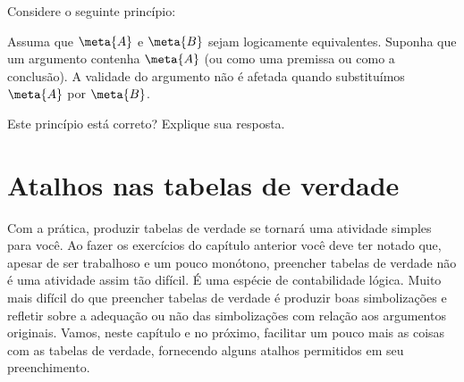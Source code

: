 \problempart 
Considere o seguinte princípio:
	\begin{ebullet}
		\item Assuma que $\meta{A}$ e $\meta{B}$ sejam logicamente equivalentes.
		Suponha que um argumento contenha $\meta{A}$ (ou como uma premissa ou como a conclusão).
		A validade do argumento não é afetada quando substituímos $\meta{A}$ por $\meta{B}$.
	\end{ebullet}
Este princípio está correto? Explique sua resposta.


\chapter{Atalhos nas tabelas de verdade}
Com a prática, produzir tabelas de verdade se tornará uma atividade simples para você.
Ao fazer os exercícios do capítulo anterior você deve ter notado que, apesar de ser trabalhoso e um pouco monótono, preencher tabelas de verdade não é uma atividade assim tão difícil.
É uma espécie de contabilidade lógica.
Muito mais difícil do que preencher tabelas de verdade é produzir boas simbolizações e refletir sobre a adequação ou não das simbolizações com relação aos argumentos originais.
Vamos, neste capítulo e no próximo, facilitar um pouco mais as coisas com as tabelas de verdade, fornecendo alguns atalhos permitidos em seu preenchimento.

